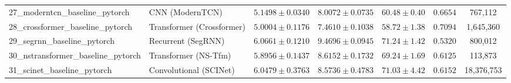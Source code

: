 \begin{table}[t]
{\begin{tabular}{l l c c c c c}
27\_moderntcn\_baseline\_pytorch & CNN (ModernTCN) & $5.1498 \pm 0.0340$ & $8.0072 \pm 0.0735$ & $60.48 \pm 0.40$ & $0.6654$ & 767,112 \\
28\_crossformer\_baseline\_pytorch & Transformer (Crossformer) & \textbf{$5.0004 \pm 0.1176$} & \textbf{$7.4610 \pm 0.1038$} & \textbf{$58.72 \pm 1.38$} & $0.7094$ & 1,645,360 \\
29\_segrnn\_baseline\_pytorch & Recurrent (SegRNN) & $6.0661 \pm 0.1210$ & $9.4696 \pm 0.0945$ & $71.24 \pm 1.42$ & $0.5320$ & 800,012 \\
30\_nstransformer\_baseline\_pytorch & Transformer (NS-Tfm) & $5.8956 \pm 0.1437$ & $8.6152 \pm 0.1732$ & $69.24 \pm 1.69$ & $0.6125$ & 113,873 \\
31\_scinet\_baseline\_pytorch & Convolutional (SCINet) & $6.0479 \pm 0.3763$ & $8.5736 \pm 0.4783$ & $71.03 \pm 4.42$ & $0.6152$ & 18,376,753 \\
\bottomrule
\end{tabular}%
}
\end{table}